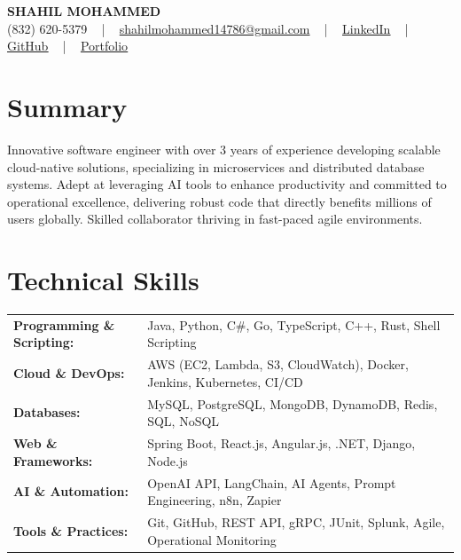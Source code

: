 \documentclass[letterpaper,11pt]{article}
\begin{document}
\begin{center}
    {\fontsize{14pt}{12pt}\selectfont \textbf{\MakeUppercase{Shahil Mohammed}}}\\ \vspace{2pt}
    \fontsize{10pt}{12pt}\selectfont (832) 620-5379 ~ | ~ \href{mailto:shahilmohammed14786@gmail.com}{shahilmohammed14786@gmail.com} ~ | ~  
    \href{https://www.linkedin.com/in/shahil-mohammed-9652931a1/}{\color{blue}\underline{LinkedIn}}  ~ | ~ 
    \href{https://github.com/freakbeast14}{\color{blue}\underline{GitHub}} ~ | ~ 
    \href{https://shahil-mohammed.netlify.app/}{\color{blue}\underline{Portfolio}}
    \vspace{-8pt}
\end{center}

\section{Summary}
\fontsize{9pt}{10pt}\selectfont
Innovative software engineer with over 3 years of experience developing scalable cloud-native solutions, specializing in microservices and distributed database systems. Adept at leveraging AI tools to enhance productivity and committed to operational excellence, delivering robust code that directly benefits millions of users globally. Skilled collaborator thriving in fast-paced agile environments.
 \vspace{-5pt}
 
\section{Technical Skills}
        \vspace{-14pt}
        \begin{table}[h]
            \fontsize{9pt}{10pt}\selectfont
            \begin{tabular}{p{0.3\linewidth} p{0.7\linewidth}}
                \textbf{Programming \& Scripting:} & Java, Python, C\#, Go, TypeScript, C++, Rust, Shell Scripting \\
                \textbf{Cloud \& DevOps:} & AWS (EC2, Lambda, S3, CloudWatch), Docker, Jenkins, Kubernetes, CI/CD \\
                \textbf{Databases:} & MySQL, PostgreSQL, MongoDB, DynamoDB, Redis, SQL, NoSQL \\
                \textbf{Web \& Frameworks:} & Spring Boot, React.js, Angular.js, .NET, Django, Node.js \\
                \textbf{AI \& Automation:} & OpenAI API, LangChain, AI Agents, Prompt Engineering, n8n, Zapier \\
                \textbf{Tools \& Practices:} & Git, GitHub, REST API, gRPC, JUnit, Splunk, Agile, Operational Monitoring \\
            \end{tabular}
        \end{table}
 \vspace{-15pt}
 
\end{document}
